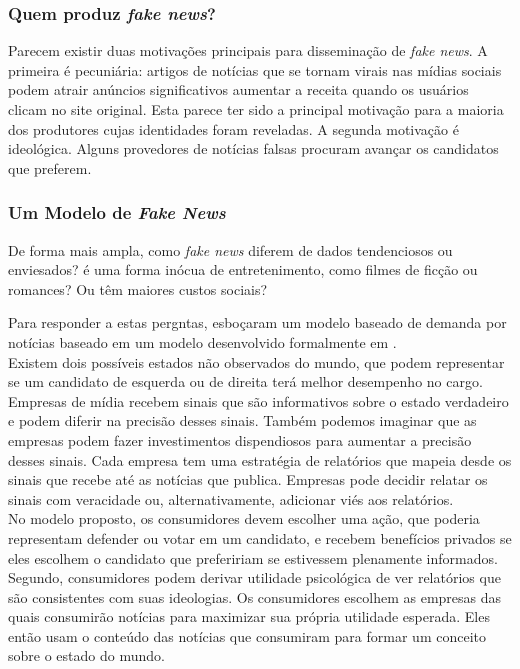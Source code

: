 \subsubsection{Quem produz \textit{fake news}?}

Parecem existir duas motivações principais para disseminação de \textit{fake news}. A primeira é pecuniária: artigos de notícias que se tornam virais nas mídias sociais podem atrair anúncios significativos aumentar a receita quando os usuários clicam no site original. Esta parece ter sido a principal motivação para a maioria dos produtores cujas identidades foram reveladas. A segunda motivação é ideológica. Alguns provedores de notícias falsas procuram avançar os candidatos que preferem.


\subsubsection{Um Modelo de \textit{Fake News}}

De forma mais ampla, como \textit{fake news} diferem de dados tendenciosos ou enviesados? é uma forma inócua de entretenimento, como filmes de ficção ou romances? Ou têm maiores custos sociais? 

Para responder a estas pergntas, \cite{allcot2017} esboçaram um modelo baseado de demanda por notícias baseado em um modelo desenvolvido formalmente em \cite{gentzkow2016}. \\

Existem dois possíveis estados não observados do mundo, que podem representar se um candidato de esquerda ou de direita terá melhor desempenho no cargo. Empresas de mídia recebem sinais que são informativos sobre o estado verdadeiro e podem diferir na
precisão desses sinais. Também podemos imaginar que as empresas podem fazer investimentos dispendiosos para aumentar a precisão desses sinais. Cada empresa tem uma estratégia de relatórios que mapeia desde os sinais que recebe até as notícias que publica. Empresas pode decidir relatar os sinais com veracidade ou, alternativamente, adicionar viés aos relatórios. \\

No modelo proposto, os consumidores devem escolher uma ação, que poderia
representam defender ou votar em um candidato, e recebem benefícios privados se
eles escolhem o candidato que prefeririam se estivessem plenamente informados. Segundo,
consumidores podem derivar utilidade psicológica de ver relatórios que são consistentes
com suas ideologias. Os consumidores escolhem as empresas das quais consumirão notícias
para maximizar sua própria utilidade esperada. Eles então usam o conteúdo das notícias que consumiram para formar um conceito sobre o estado do mundo. \\

